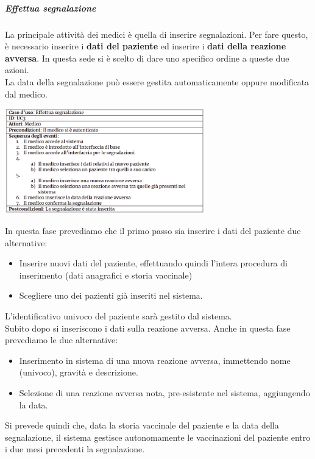 \documentclass{article}
\begin{document}
\newpage
\subparagraph*{Effettua segnalazione}
La principale attività dei medici è quella di inserire segnalazioni. Per fare questo, è necessario
inserire i \textbf{dati del paziente} ed inserire i \textbf{dati della reazione avversa}. In questa sede si è scelto di dare uno specifico ordine a queste due azioni.\\
La data della segnalazione può essere gestita automaticamente oppure modificata dal medico.
\begin{center}
    \includegraphics[width=0.65\textwidth]{pictures/UC3.png}
\end{center}
In questa fase prevediamo che il primo passo sia inserire i dati del paziente due alternative:
\begin{itemize}
    \item Inserire nuovi dati del paziente, effettuando quindi l'intera procedura di inserimento (dati anagrafici e storia vaccinale)
    \item Scegliere uno dei pazienti già inseriti nel sistema.
\end{itemize}
L'identificativo univoco del paziente sarà gestito dal sistema.\\
Subito dopo si inseriscono i dati sulla reazione avversa.
Anche in questa fase prevediamo le due alternative:
\begin{itemize}
    \item Inserimento in sistema di una nuova reazione avversa, immettendo nome (univoco), gravità e descrizione.
    \item Selezione di una reazione avversa nota, pre-esistente nel sistema, aggiungendo la data.
\end{itemize}
Si prevede quindi che, data la storia vaccinale del paziente e la data della segnalazione, il sistema gestisce autonomamente
le vaccinazioni del paziente entro i due mesi precedenti la segnalazione.
\end{document}
